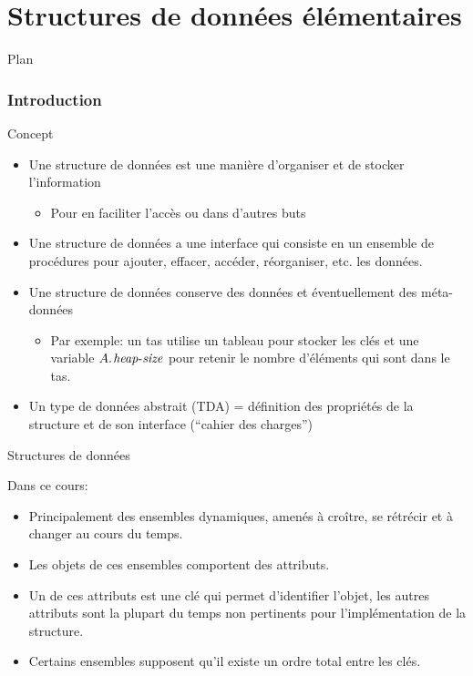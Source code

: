 
\part{Structures de données élémentaires}


\begin{frame}{Plan}

\tableofcontents

\end{frame}

\section{Introduction}

\begin{frame}{Concept}
\begin{itemize}
\item Une \alert{structure de données} est une manière d'organiser et de stocker l'information
\begin{itemize}
\item Pour en faciliter l'accès ou dans d'autres buts
\end{itemize}
\item Une structure de données a une \alert{interface} qui consiste en un ensemble de procédures pour ajouter, effacer, accéder, réorganiser, etc. les données.
\item Une structure de données conserve des \alert{données} et éventuellement des \alert{méta-données}
\begin{itemize}
\item Par exemple: un tas utilise un tableau pour stocker les clés et une variable $\attrib{A}{heap-size}$ pour retenir le nombre d'éléments qui sont dans le tas.
\end{itemize}
\item Un type de données abstrait (TDA) = définition des propriétés
  de la structure et de son interface (``cahier des charges'')
\end{itemize}
\end{frame}

\begin{frame}{Structures de données}

Dans ce cours:
\begin{itemize}
\item Principalement des \alert{ensembles dynamiques}, amenés à croître, se
  rétrécir et à changer au cours du temps.
\item Les objets de ces ensembles comportent des attributs.
\item Un de ces attributs est une \alert{clé} qui permet d'identifier
  l'objet, les autres attributs sont la plupart du temps non
  pertinents pour l'implémentation de la structure.
\item Certains ensembles supposent qu'il existe un \alert{ordre total}
  entre les clés.
\end{itemize}

\end{frame}

